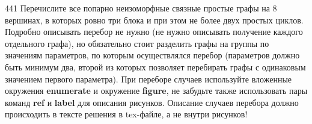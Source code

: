 \begin{task}{441}
Перечислите все попарно неизоморфные связные простые графы на \(8\) вершинах, в которых ровно три блока и при этом не более двух простых циклов. Подробно описывать перебор не нужно (не нужно описывать получение каждого отдельного графа), но обязательно стоит разделить графы на группы по значениям параметров, по которым осуществлялся перебор (параметров должно быть минимум два, второй из которых позволяет перебирать графы с одинаковым значением первого параметра). При переборе случаев используйте вложенные окружения \textbf{enumerate} и окружение \textbf{figure}, не забудьте также использовать пары команд \textbf{ref} и \textbf{label} для описания рисунков. Описание случаев перебора должно происходить в тексте решения в tex-файле, а не внутри рисунков!
\end{task}

